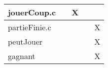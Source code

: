 \begin{table}[h]
\begin{tabular}{l|c|c|c|c|}
\multicolumn{1}{|l|}{jouerCoup.c}                       &                       & X               &                       &                        \\ \hline
\multicolumn{1}{|l|}{partieFinie.c}                     &                       &                &                       & X                      \\ \hline
\multicolumn{1}{|l|}{peutJouer}                         &                       &                &                       & X                      \\ \hline
\multicolumn{1}{|l|}{gagnant}                           &                       &                &                       & X                      \\ \hline
\end{tabular}
\end{table}

\newpage

